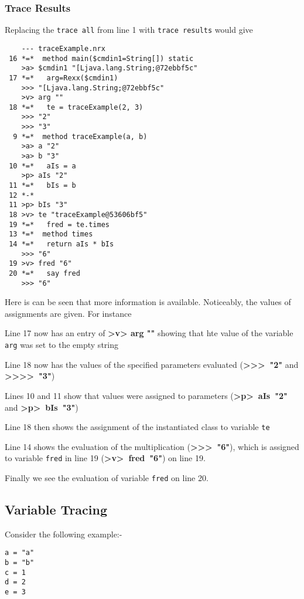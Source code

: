 {\subsubsection{Trace Results}
Replacing the \texttt{trace all} from line 1 with \texttt{trace results} would give
\begin{verbatim}
    --- traceExample.nrx 
 16 *=*  method main($cmdin1=String[]) static
    >a> $cmdin1 "[Ljava.lang.String;@72ebbf5c" 
 17 *=*   arg=Rexx($cmdin1)
    >>> "[Ljava.lang.String;@72ebbf5c" 
    >v> arg "" 
 18 *=*   te = traceExample(2, 3)
    >>> "2" 
    >>> "3" 
  9 *=*  method traceExample(a, b)
    >a> a "2" 
    >a> b "3" 
 10 *=*   aIs = a
    >p> aIs "2" 
 11 *=*   bIs = b
 12 *-* 
 11 >p> bIs "3"
 18 >v> te "traceExample@53606bf5"
 19 *=*   fred = te.times
 13 *=*  method times
 14 *=*   return aIs * bIs
    >>> "6" 
 19 >v> fred "6"
 20 *=*   say fred
    >>> "6" 
\end{verbatim}
Here is can be seen that more information is available. Noticeably, the values of assignments are given.
For instance
\begin{description}
\item Line 17 now has an entry of \textbf{>v> arg ""} showing that hte value of the variable \texttt{arg} was set to the empty string
\item Line 18 now has the values of the specified parameters evaluated (\mbox{\textbf{\textgreater\textgreater> "2"}} and \mbox{\textbf{\textgreater\textgreater>> "3"}})
\item Lines 10 and 11 show that values were assigned to parameters (\mbox{\textbf{>p> aIs "2"}} and \mbox{\textbf{>p> bIs "3"})}
\item Line 18 then shows the assignment of the instantiated class to variable \texttt{te}
\item Line 14 shows the evaluation of the multiplication (\mbox{\textbf{\textgreater\textgreater> "6"}}), which is assigned to variable \texttt{fred} in line 19 (\mbox{\textbf{>v> fred "6"}}) on line 19.
\item Finally we see the evaluation of variable \texttt{fred} on line 20.
\end{description}
\subsection{Variable Tracing}
Consider the following example:-
\begin{lstlisting}[label=Trace2, caption=Trace Example 2]
a = "a"
b = "b"
c = 1
d = 2
e = 3


\end{lstlisting}}
